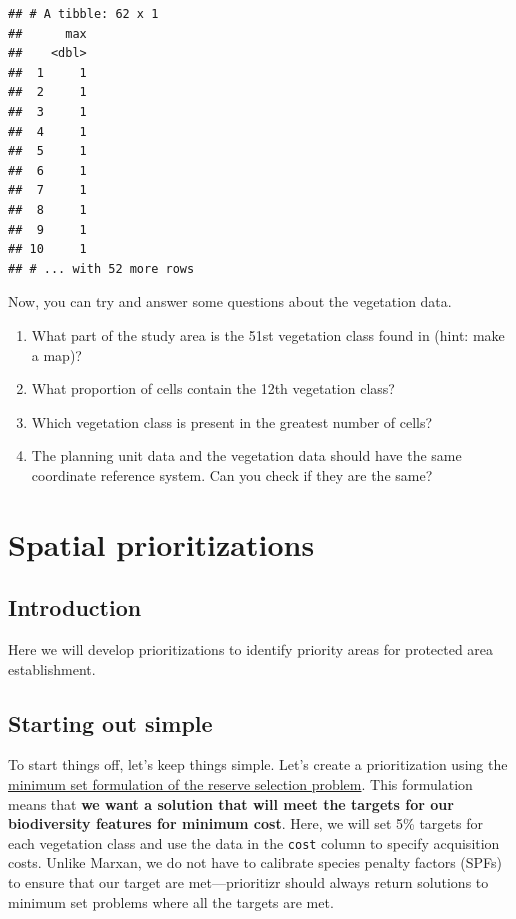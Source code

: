 \documentclass[
  12pt,
]{book}
\providecommand{\tightlist}{%
  \setlength{\itemsep}{0pt}\setlength{\parskip}{0pt}}
\begin{document}
\begin{verbatim}
## # A tibble: 62 x 1
##      max
##    <dbl>
##  1     1
##  2     1
##  3     1
##  4     1
##  5     1
##  6     1
##  7     1
##  8     1
##  9     1
## 10     1
## # ... with 52 more rows
\end{verbatim}

Now, you can try and answer some questions about the vegetation data.

\begin{rmdquestion}
\begin{enumerate}
\def\labelenumi{\arabic{enumi}.}
\tightlist
\item
  What part of the study area is the 51st vegetation class found in (hint: make a map)?
\item
  What proportion of cells contain the 12th vegetation class?
\item
  Which vegetation class is present in the greatest number of cells?
\item
  The planning unit data and the vegetation data should have the same coordinate reference system. Can you check if they are the same?
\end{enumerate}
\end{rmdquestion}

\hypertarget{spatial-prioritizations}{%
\chapter{Spatial prioritizations}\label{spatial-prioritizations}}

\hypertarget{introduction-1}{%
\section{Introduction}\label{introduction-1}}

Here we will develop prioritizations to identify priority areas for protected area establishment.

\hypertarget{starting-out-simple}{%
\section{Starting out simple}\label{starting-out-simple}}

To start things off, let's keep things simple. Let's create a prioritization using the \href{https://prioritizr.net/reference/add_min_set_objective.html}{minimum set formulation of the reserve selection problem}. This formulation means that \textbf{we want a solution that will meet the targets for our biodiversity features for minimum cost}. Here, we will set 5\% targets for each vegetation class and use the data in the \texttt{cost} column to specify acquisition costs. Unlike Marxan, we do not have to calibrate species penalty factors (SPFs) to ensure that our target are met---prioritizr should always return solutions to minimum set problems where all the targets are met.
\end{document}
